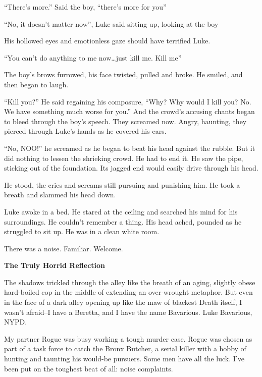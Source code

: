 ``There's more.'' Said the boy,
``there's more for you''

``No, it doesn't matter now'', Luke said sitting
up, looking at the boy

His hollowed eyes and emotionless gaze should have terrified
Luke.

``You can't do anything to me now{\ldots}just kill me.
Kill me''

The boy's brows furrowed, his face twisted, pulled and broke.
He smiled, and then began to laugh.

``Kill you?'' He said regaining his composure,
``Why? Why would I kill you? No. We have something much worse
for you.'' And the crowd's accusing chants began to
bleed through the boy's speech. They screamed now. Angry,
haunting, they pierced through Luke's hands as he covered his
ears.

``No, NOO!'' he screamed as he began to beat his head
against the rubble. But it did nothing to lessen the shrieking
crowd. He had to end it. He saw the pipe, sticking out of the
foundation. Its jagged end would easily drive through his
head.

He stood, the cries and screams still pursuing and punishing him.
He took a breath and slammed his head down.



Luke awoke in a bed. He stared at the ceiling and searched his mind
for his surroundings. He couldn't remember a thing. His head
ached, pounded as he struggled to sit up. He was in a clean white
room.

There was a noise. Familiar. Welcome. 

 




{\bf The Truly Horrid Reflection}





The shadows trickled through the alley like the breath of an aging,
slightly obese hard-boiled cop in the middle of extending an
over-wrought metaphor. But even in the face of a dark alley opening
up like the maw of blackest Death itself, I wasn't afraid--I
have a Beretta, and I have the name Bavarious. Luke Bavarious,
NYPD.



My partner Rogue was busy working a tough murder case. Rogue was
chosen as part of a task force to catch the Bronx Butcher, a serial
killer with a hobby of hunting and taunting his would-be pursuers.
Some men have all the luck. I've been put on the toughest
beat of all: noise complaints.



